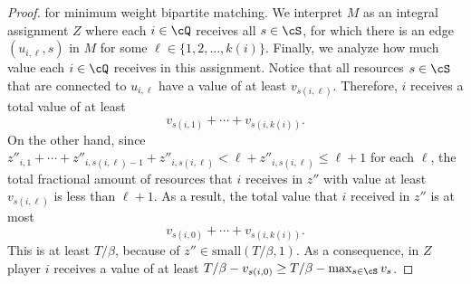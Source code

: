 \begin{proof}
    for minimum weight bipartite matching.
    We interpret $M$ as an integral assignment $Z$
    where each $i\in \cQ$ receives all $s\in \cS$,
    for which there is an edge $(u_{i,\ell}, s)$ in $M$
    for some $\ell\in\{1,2,\dotsc,k(i)\}$.
    Finally, we analyze how much value each $i\in\cQ$
    receives in this assignment.
    Notice that all resources $s\in\cS$
    that are connected to $u_{i,\ell}$ have a value
    of at least $v_{s(i,\ell)}$.
    Therefore, $i$ receives a total value of at least
    \begin{equation*}
        v_{s(i,1)} + \cdots + v_{s(i,k(i))} .
    \end{equation*}
    On the other hand, 
    since $z''_{i,1} + \cdots + z''_{i,s(i, \ell ) - 1} + z''_{i,s(i, \ell)} < \ell + z''_{i,s(i, \ell)} \le \ell + 1$ for each $\ell$,
    the total fractional amount of resources that $i$ receives in $z''$
    with value at least $v_{s(i, \ell)}$ is less than $\ell + 1$.
    As a result, the total value that $i$ received in $z''$
    is at most
    \begin{equation*}
        v_{s(i,0)} + \cdots + v_{s(i,k(i))} .
    \end{equation*}
    This is at least $T/\beta$, because of $z''\in\mathrm{small}(T/\beta,1)$.
    As a consequence, in $Z$ player $i$ receives a value of at least
    $T/\beta - v_{s(i,0)} \ge T/\beta - \max_{s\in\cS} v_s$.
\end{proof}


